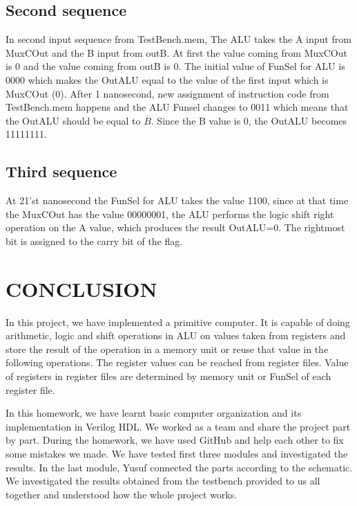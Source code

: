\documentclass[pdftex,12pt,a4paper]{article}
\begin{document}
\subsection{Second sequence}
In second input sequence from TestBench.mem, The ALU takes the A input from MuxCOut and the B input from outB. At first the value 
coming from MuxCOut is 0 and the value coming
from outB is 0. The initial value of FunSel for ALU is 0000 which makes the OutALU equal to the value of the first input which is 
MuxCOut (0). After 1 nanosecond, new assignment of instruction code from TestBench.mem happens and 
the ALU Funsel changes to 0011 which means that the OutALU should be equal to $\overline{B}$. Since the B value
is 0, the OutALU becomes 11111111. 
\subsection{Third sequence}
At 21'st nanosecond the FunSel for ALU takes the value 1100, since at that time the MuxCOut has
the value 00000001, the ALU performs the logic shift right operation on the A value, which produces the result OutALU=0. The rightmost
bit is assigned to the carry bit of the flag.
\section{CONCLUSION}
In this project, we have implemented a primitive computer. It is capable of doing arithmetic, logic and shift operations in ALU on values taken from
registers and store the result of the operation in a memory unit or reuse that value in the following operations. The register values can be 
reached from register files. Value of registers in register files are determined by memory unit or FunSel of each register file.

In this homework, we have learnt basic computer organization and its implementation in Verilog HDL. We worked as a team and share the project part by part.
During the homework, we have used GitHub and help each other to fix some mistakes we made. We have tested first three modules and investigated the results.
In the last module, Yusuf connected the parts according to the schematic. We investigated the results obtained from the testbench provided to us all together
and understood how the whole project works.
\end{document}
